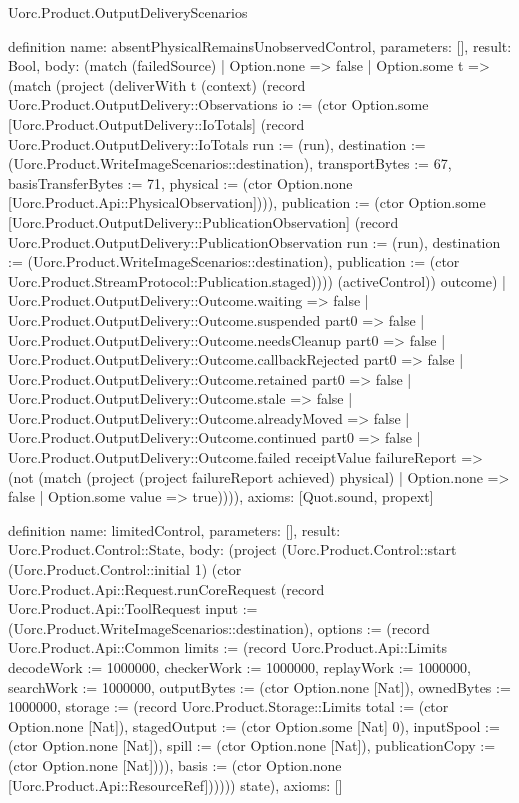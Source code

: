 \begin{lexlean}{Uorc.Product.OutputDeliveryScenarios}
\begin{semanticmodule}
definition{
  name: absentPhysicalRemainsUnobservedControl,
  parameters: [],
  result: Bool,
  body: (match (failedSource)
    | Option.none => false
    | Option.some t => (match (project (deliverWith t (context) (record Uorc.Product.OutputDelivery::Observations {io := (ctor Option.some [Uorc.Product.OutputDelivery::IoTotals] (record Uorc.Product.OutputDelivery::IoTotals {run := (run), destination := (Uorc.Product.WriteImageScenarios::destination), transportBytes := 67, basisTransferBytes := 71, physical := (ctor Option.none [Uorc.Product.Api::PhysicalObservation])})), publication := (ctor Option.some [Uorc.Product.OutputDelivery::PublicationObservation] (record Uorc.Product.OutputDelivery::PublicationObservation {run := (run), destination := (Uorc.Product.WriteImageScenarios::destination), publication := (ctor Uorc.Product.StreamProtocol::Publication.staged)}))}) (activeControl)) outcome)
      | Uorc.Product.OutputDelivery::Outcome.waiting => false
      | Uorc.Product.OutputDelivery::Outcome.suspended part0 => false
      | Uorc.Product.OutputDelivery::Outcome.needsCleanup part0 => false
      | Uorc.Product.OutputDelivery::Outcome.callbackRejected part0 => false
      | Uorc.Product.OutputDelivery::Outcome.retained part0 => false
      | Uorc.Product.OutputDelivery::Outcome.stale => false
      | Uorc.Product.OutputDelivery::Outcome.alreadyMoved => false
      | Uorc.Product.OutputDelivery::Outcome.continued part0 => false
      | Uorc.Product.OutputDelivery::Outcome.failed receiptValue failureReport => (not (match (project (project failureReport achieved) physical)
        | Option.none => false
        | Option.some value => true)))),
  axioms: [Quot.sound, propext]
}

definition{
  name: limitedControl,
  parameters: [],
  result: Uorc.Product.Control::State,
  body: (project (Uorc.Product.Control::start (Uorc.Product.Control::initial 1) (ctor Uorc.Product.Api::Request.runCoreRequest (record Uorc.Product.Api::ToolRequest {input := (Uorc.Product.WriteImageScenarios::destination), options := (record Uorc.Product.Api::Common {limits := (record Uorc.Product.Api::Limits {decodeWork := 1000000, checkerWork := 1000000, replayWork := 1000000, searchWork := 1000000, outputBytes := (ctor Option.none [Nat]), ownedBytes := 1000000, storage := (record Uorc.Product.Storage::Limits {total := (ctor Option.none [Nat]), stagedOutput := (ctor Option.some [Nat] 0), inputSpool := (ctor Option.none [Nat]), spill := (ctor Option.none [Nat]), publicationCopy := (ctor Option.none [Nat])})}), basis := (ctor Option.none [Uorc.Product.Api::ResourceRef])})}))) state),
  axioms: []
}


\end{semanticmodule}
\end{lexlean}
